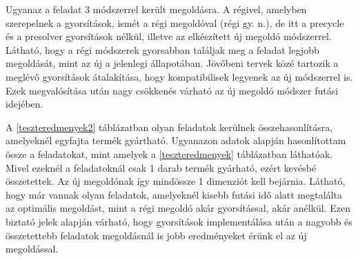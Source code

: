 Ugyanaz a feladat 3 módszerrel került megoldásra. A régivel, amelyben szerepelnek a gyorsítások, ismét a régi megoldóval (régi gy. n.), de itt a precycle és a presolver gyorsítások nélkül, illetve az elkészített új megoldó módszerrel. Látható, hogy a régi módszerek gyorsabban találjak meg a feladat legjobb megoldását, mint az új a jelenlegi állapotában. Jövőbeni tervek közé tartozik a meglévő gyorsítások átalakítása, hogy kompatibilisek legyenek az új módszerrel is. Ezek megvalósítása után nagy csökkenés várható az új megoldó módszer futási idejében. 

A \ref{teszteredmenyek2} táblázatban olyan feladatok kerülnek összehasonlításra, amelyeknél egyfajta termék gyártható. Ugyanazon adatok alapján hasonlítottam össze a feladatokat, mint amelyek a \ref{teszteredmenyek} táblázatban láthatóak. Mivel ezeknél a feladatoknál csak 1 darab termék gyárható, ezért kevésbé összetettek. Az új megoldónak így mindössze 1 dimenziót kell bejárnia. Látható, hogy már vannak olyan feladatok, amelyeknél kisebb futási idő alatt megtalálta az optimális megoldást, mint a régi megoldó akár gyorsítással, akár anélkül. Ezen biztató jelek alapján várható, hogy gyorsítások implementálása után a nagyobb és összetettebb feladatok megoldásnál is jobb eredményeket érünk el az új megoldással.

